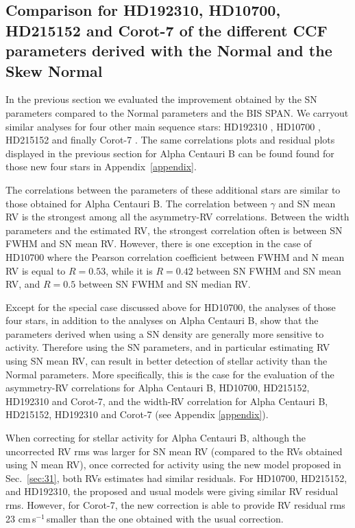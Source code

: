 \documentclass{aa}
\def\cms{\hbox{\,cm\,s$^{-1}$}}       %
\begin{document}
\subsection{Comparison for HD192310, HD10700, HD215152 and Corot-7 of the different CCF parameters derived with the Normal and the Skew Normal} \label{sec:real_data_other_stars}

In the previous section we evaluated the improvement obtained by the SN parameters compared to the Normal parameters and the BIS SPAN. We carryout similar analyses for four other main sequence stars: HD192310 \citep[K2V,][]{Pepe-2011}, HD10700 \citep[G8V,][]{Feng:2017ac}, HD215152 \citep[K3V,][]{Delisle:2018aa} and finally Corot-7 \citep[K0V,][]{Haywood-2014}. The same correlations plots and residual plots displayed in the previous section for Alpha Centauri B can be found found for those new four stars in Appendix~\ref{appendix}.

The correlations between the parameters of these additional stars are similar to those obtained for Alpha Centauri B. The correlation between $\gamma$ and SN mean RV is the strongest among all the asymmetry-RV correlations. 
%
Between the width parameters and the estimated RV, the strongest correlation often is between SN FWHM and SN mean RV. 
However, there is one exception in the case of HD10700 where the Pearson correlation coefficient between FWHM and N mean RV is equal to $R=0.53$, while it is $R=0.42$ between SN FWHM and SN mean RV, and $R=0.5$ between SN FWHM and SN median RV.

Except for the special case discussed above for HD10700, the analyses of those four stars, in addition to the analyses on Alpha Centauri B, show that the parameters derived when using a SN density are generally more sensitive to activity.  
Therefore using the SN parameters, and in particular estimating RV using SN mean RV, can result in better detection of stellar activity than the Normal parameters. 
More specifically, this is the case for the evaluation of the asymmetry-RV correlations for Alpha Centauri B, HD10700, HD215152, HD192310 and Corot-7, and the width-RV correlation for Alpha Centauri B, HD215152, HD192310 and Corot-7 (see Appendix \ref{appendix}).

When correcting for stellar activity for  Alpha Centauri B, although the uncorrected RV rms was larger for SN mean RV (compared to the RVs obtained using N mean RV), once corrected for activity using the new model proposed in Sec.~\ref{sec:31}, both RVs estimates had similar residuals. 
For HD10700, HD215152, and HD192310, the proposed and usual models were giving similar RV residual rms.
However, for Corot-7, the new correction is able to provide RV residual rms 23\,\cms\,smaller than the one obtained with the usual correction.
\end{document}
